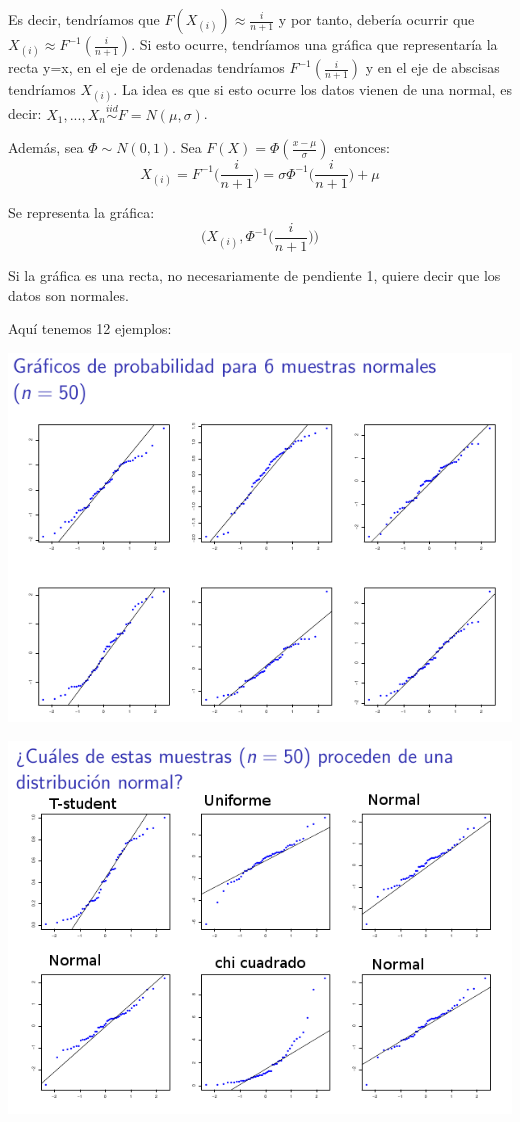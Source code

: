\documentclass[nochap]{apuntes}
\begin{document}
Es decir, tendríamos que $F(X_{(i)}) \approx \frac{i}{n+1}$ y por tanto, debería ocurrir que $X_{(i)} \approx F^{-1}(\frac{i}{n+1})$. Si esto ocurre, tendríamos una gráfica que representaría la recta y=x, en el eje de ordenadas tendríamos $F^{-1}(\frac{i}{n+1})$ y en el eje de abscisas tendríamos $X_{(i)}$. La idea es que si esto ocurre los datos vienen de una normal, es decir: $X_1,...,X_n \stackrel{iid}{\sim} F=N(\mu, \sigma)$.

Además, sea $\Phi \sim N(0,1)$. Sea $F(X) = \Phi(\frac{x-\mu}{\sigma})$ entonces:
$$ X_{(i)} = F^{-1}\Big(\frac{i}{n+1}\Big) = \sigma \Phi^{-1}\Big(\frac{i}{n+1}\Big)+ \mu $$

Se representa la gráfica:
$$ \bigg( X_{(i)}, \Phi^{-1}\Big(\frac{i}{n+1}\Big) \bigg)$$

Si la gráfica es una recta, no necesariamente de pendiente 1, quiere decir que los datos son normales.

Aquí tenemos 12 ejemplos:

\includegraphics[scale=0.6]{img/graficos1.png}

\includegraphics[scale=0.6]{img/graficos2.png}
\end{document}
